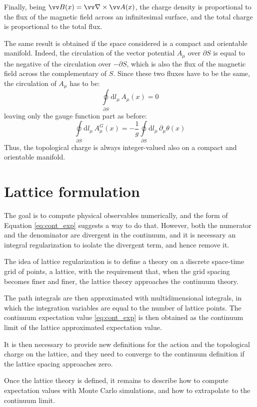 Finally, being $\vv B(x) = \vv\nabla \times \vv A(x)$, the charge density is proportional to the flux of the magnetic field across an infinitesimal surface,
and the total charge is proportional to the total flux.

The same result is obtained if the space considered is a compact and orientable manifold.
Indeed, the circulation of the vector potential $A_\mu$ over $\partial S$ is equal to the negative of the circulation over $-\partial S$,
which is also the flux of the magnetic field across the complementary of $S$.
Since these two fluxes have to be the same, the circulation of $A_\mu$ has to be:
\[
    \oint\limits_{\partial S}\mathrm dl_\mu\,A_\mu(x) = 0
\]
leaving only the gauge function part as before:
\[
    \oint\limits_{\partial S}\mathrm dl_\mu\,A_\mu^G(x) = -\frac{1}{g}\oint\limits_{\partial S}\mathrm dl_\mu\,\partial_\mu\theta(x)
\]
Thus, the topological charge is always integer-valued also on a compact and orientable manifold.

\section{Lattice formulation}
The goal is to compute physical observables numerically, and the form of Equation \eqref{eq:cont_exp} suggests a way to do that.
However, both the numerator and the denominator are divergent in the continuum, and it is necessary an integral regularization to isolate the divergent term,
and hence remove it.

The idea of lattice regularization is to define a theory on a discrete space-time grid of points, \ie a lattice,
with the requirement that, when the grid spacing becomes finer and finer,
the lattice theory approaches the continuum theory.

The path integrals are then approximated with multidimensional integrals, in which the integration variables are equal to the number of lattice points.
The continuum expectation value \eqref{eq:cont_exp} is then obtained as the continuum limit of the lattice approximated expectation value.

It is then necessary to provide new definitions for the action and the topological charge on the lattice,
and they need to converge to the continuum definition if the lattice spacing approaches zero.

Once the lattice theory is defined, it remains to describe how to compute expectation values with Monte Carlo simulations, and how to extrapolate to the continuum limit.

